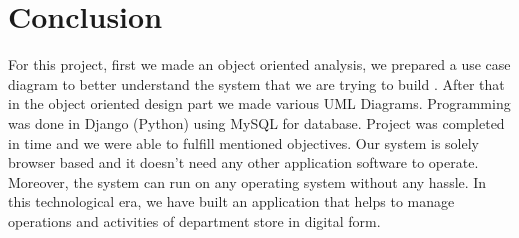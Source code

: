 \section{Conclusion}

For this project, first we made an object oriented analysis, we prepared a use
case diagram to better understand the system that we are trying to build .
After that in the object oriented design part we made various UML Diagrams.
Programming was done in Django (Python) using MySQL for database. Project was
completed in time and we were able to fulfill mentioned objectives. Our system
is solely browser based and it doesn't need any other application software to
operate. Moreover, the system can run on any operating system without any
hassle. In this technological era, we have built an application that helps to
manage operations and activities of department store in digital form.

